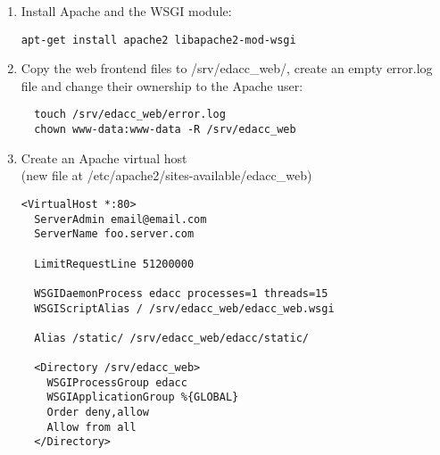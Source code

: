 \begin{enumerate}
\item Install Apache and the WSGI module: \begin{verbatim}apt-get install apache2 libapache2-mod-wsgi\end{verbatim}
\item{ Copy the web frontend files to /srv/edacc\_web/, create an empty error.log file and change their ownership to the Apache user: 
\begin{verbatim}
  touch /srv/edacc_web/error.log
  chown www-data:www-data -R /srv/edacc_web
\end{verbatim}
}
\item{ Create an Apache virtual host\\
(new file at /etc/apache2/sites-available/edacc\_web)
\begin{verbatim}
<VirtualHost *:80>
  ServerAdmin email@email.com
  ServerName foo.server.com

  LimitRequestLine 51200000

  WSGIDaemonProcess edacc processes=1 threads=15
  WSGIScriptAlias / /srv/edacc_web/edacc_web.wsgi

  Alias /static/ /srv/edacc_web/edacc/static/

  <Directory /srv/edacc_web>
    WSGIProcessGroup edacc
    WSGIApplicationGroup %{GLOBAL}
    Order deny,allow
    Allow from all
  </Directory>


\end{verbatim}}
\end{enumerate}
